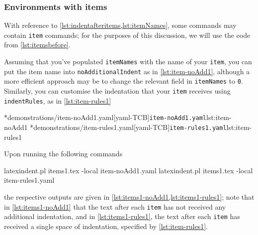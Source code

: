 \subsubsection{Environments with items}
	With reference to \vref{lst:indentafteritems,lst:itemNames}, some commands may contain
	\texttt{item} commands; for the purposes of this discussion, we will use the code from
	\vref{lst:itemsbefore}.

	Assuming that you've populated \texttt{itemNames} with the name of your \texttt{item},
	you can put the item name into \texttt{noAdditionalIndent} as in \cref{lst:item-noAdd1},
	although a more efficient approach may be to change the relevant field in
	\texttt{itemNames} to \texttt{0}. Similarly, you can customise the indentation that your
	\texttt{item} receives using \texttt{indentRules}, as in \cref{lst:item-rules1}

	\begin{cmhtcbraster}[raster column skip=.1\linewidth]
		\cmhlistingsfromfile[style=yaml-LST]*{demonstrations/item-noAdd1.yaml}[yaml-TCB]{\texttt{item-noAdd1.yaml}}{lst:item-noAdd1}
		\cmhlistingsfromfile[style=yaml-LST]*{demonstrations/item-rules1.yaml}[yaml-TCB]{\texttt{item-rules1.yaml}}{lst:item-rules1}
	\end{cmhtcbraster}

	Upon running the following commands
	\begin{commandshell}
latexindent.pl items1.tex -local item-noAdd1.yaml  
latexindent.pl items1.tex -local item-rules1.yaml  
\end{commandshell}
	the respective outputs are given in \cref{lst:items1-noAdd1,lst:items1-rules1}; note that
	in \cref{lst:items1-noAdd1} that the text after each \texttt{item} has not received any
	additional indentation, and in \cref{lst:items1-rules1}, the text after each
	\texttt{item} has received a single space of indentation, specified by
	\cref{lst:item-rules1}.

	\begin{minipage}{.45\textwidth}
	\end{minipage}
	\hfill
	\begin{minipage}{.45\textwidth}
	\end{minipage}

